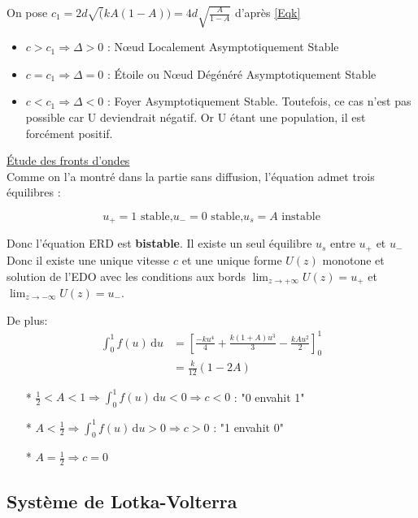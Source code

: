 \documentclass[a4paper,11pt]{article}
\begin{document}
\begin{itemize}[label=$\bullet$]
\begin{itemize}
\begin{itemize}[label=$\blacktriangleright$]
            On pose $c_1=2d\sqrt(kA(1-A))=4d\sqrt{\frac{A}{1-A}}$ d'après \eqref{Eqk}
            \begin{itemize}[label=$\rightarrow$]
				\item $c>c_1 \Rightarrow \Delta >0$ : Nœud Localement Asymptotiquement Stable
                \item $c=c_1 \Rightarrow \Delta =0$ : Étoile ou Nœud Dégénéré Asymptotiquement Stable
                \item $c<c_1 \Rightarrow \Delta <0$ : Foyer Asymptotiquement Stable. Toutefois, ce cas n'est pas possible car U deviendrait négatif. Or U étant une population, il est forcément positif.
			\end{itemize}
		\end{itemize}
	\end{itemize}
\end{itemize}

\noindent \underline{Étude des fronts d'ondes}\\
Comme on l'a montré dans la partie sans diffusion, l'équation admet trois équilibres :

$$u_+=1 \text{ stable,} u_-=0 \text{ stable,} u_s=A \text{ instable}$$
	
    Donc l'équation ERD est \textbf{bistable}. Il existe un seul équilibre $u_s$ entre $u_+$ et $u_-$ \\
    Donc il existe une unique vitesse $c$ et une unique forme $U(z)$ monotone et solution de l'EDO avec les conditions aux bords $\lim_{z \to +\infty} U(z)=u_+$ et $\lim_{z \to -\infty} U(z)=u_-$. 
    
    De plus: 
	\begin{align*}
		\int_{0}^1 f(u)\, \mathrm{d}u &=\left[\frac{-ku^4}{4}+\frac{k(1+A)u^3}{3}-\frac{kAu^2}{2}\right]_0^1\\
		&=\frac{k}{12}(1-2A)
	\end{align*}
    	\begin{itemize}
        	\item[*] $\frac{1}{2}<A<1 \Rightarrow \int_{0}^1 f(u)\, \mathrm{d}u<0 \Rightarrow c<0$ : "0 envahit 1"
            \item[*] $A<\frac{1}{2} \Rightarrow \int_{0}^1 f(u)\, \mathrm{d}u>0 \Rightarrow c>0$ : "1 envahit 0"
            \item[*] $A=\frac{1}{2} \Rightarrow c=0$
		\end{itemize}




\subsection{Système de Lotka-Volterra}
\end{document}
